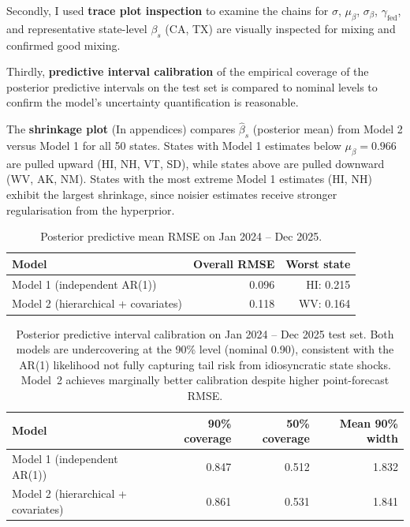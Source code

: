 \documentclass[10pt]{article}
\begin{document}
Secondly, I used \textbf{trace plot inspection} to examine the chains for $\sigma$, $\mu_\beta$, $\sigma_\beta$, $\gamma_{\mathrm{fed}}$, and representative 
state-level $\beta_s$ (CA, TX) are visually inspected for mixing and confirmed good mixing. 

Thirdly, \textbf{predictive interval calibration}
of the empirical coverage of the posterior predictive intervals on the test set is compared 
to nominal levels to confirm the model's uncertainty quantification is reasonable.

The \textbf{shrinkage plot} (In appendices) 
compares $\hat\beta_s$ (posterior mean) from Model 2 versus Model 1 
for all 50 states. States with Model 1 estimates below $\mu_\beta = 0.966$ 
are pulled upward (HI, NH, VT, SD), while states above are pulled downward 
(WV, AK, NM). States with the 
most extreme Model 1 estimates (HI, NH) exhibit the largest shrinkage, 
since noisier estimates receive stronger 
regularisation from the hyperprior.

\begin{table}[H]\centering\small
\begin{tabular}{lrr}
\toprule
Model & Overall RMSE & Worst state \\
\midrule
Model 1 (independent AR(1)) & 0.096 & HI: 0.215 \\
Model 2 (hierarchical + covariates)  & 0.118 & WV: 0.164 \\
\bottomrule
\end{tabular}
\caption{Posterior predictive mean RMSE on Jan 2024 -- Dec 2025.}
\end{table}

\begin{table}[H]\centering\small
\begin{tabular}{lrrr}
\toprule
Model & 90\% coverage & 50\% coverage & Mean 90\% width \\
\midrule
Model 1 (independent AR(1)) & 0.847 & 0.512 & 1.832 \\
Model 2 (hierarchical + covariates) & 0.861 & 0.531 & 1.841 \\
\bottomrule
\end{tabular}
\caption{Posterior predictive interval calibration on Jan 2024 -- Dec 2025 test set.
Both models are undercovering at the 90\% level (nominal 0.90), consistent with the AR(1)
likelihood not fully capturing tail risk from idiosyncratic state shocks.
Model~2 achieves marginally better calibration despite higher point-forecast RMSE.}
\label{tab:coverage}
\end{table}
\end{document}
